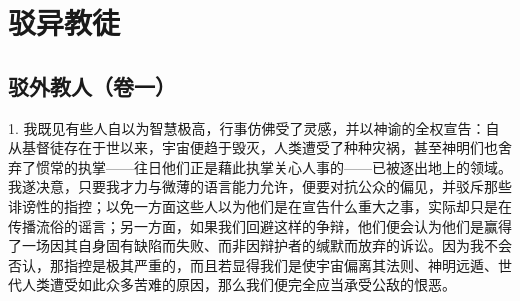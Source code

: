 
\chapter{驳异教徒}


\newline{}\newline{}\newline{}\newline{}\newline{}\newline{}\par



\section{驳外教人（卷一）}

1. 我既见有些人自以为智慧极高，行事仿佛受了灵感，并以神谕的全权宣告：自从基督徒存在于世以来，宇宙便趋于毁灭，人类遭受了种种灾祸，甚至神明们也舍弃了惯常的执掌——往日他们正是藉此执掌关心人事的——已被逐出地上的领域。我遂决意，只要我才力与微薄的语言能力允许，便要对抗公众的偏见，并驳斥那些诽谤性的指控；以免一方面这些人以为他们是在宣告什么重大之事，实际却只是在传播流俗的谣言；另一方面，如果我们回避这样的争辩，他们便会认为他们是赢得了一场因其自身固有缺陷而失败、而非因辩护者的缄默而放弃的诉讼。因为我不会否认，那指控是极其严重的，而且若显得我们是使宇宙偏离其法则、神明远遁、世代人类遭受如此众多苦难的原因，那么我们便完全应当承受公敌的恨恶。\par

